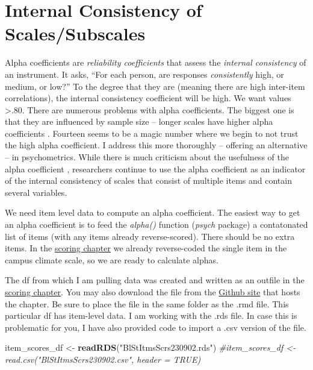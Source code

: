 \documentclass[
  11pt,
]{book}
\newenvironment{Shaded}{\begin{snugshade}}{\end{snugshade}}
\newcommand{\CommentTok}[1]{\textcolor[rgb]{0.37,0.37,0.37}{\textit{#1}}}
\newcommand{\FunctionTok}[1]{\textcolor[rgb]{0.27,0.27,0.27}{\textbf{#1}}}
\newcommand{\NormalTok}[1]{#1}
\newcommand{\OtherTok}[1]{\textcolor[rgb]{0.37,0.37,0.37}{#1}}
\newcommand{\StringTok}[1]{\textcolor[rgb]{0.5,0.5,0.5}{#1}}
\begin{document}
\hypertarget{internal-consistency-of-scalessubscales}{%
\section{Internal Consistency of Scales/Subscales}\label{internal-consistency-of-scalessubscales}}

Alpha coefficients are \emph{reliability coefficients} that assess the \emph{internal consistency} of an instrument. It asks, ``For each person, are responses \emph{consistently} high, or medium, or low?'' To the degree that they are (meaning there are high inter-item correlations), the internal consistency coefficient will be high. We want values \textgreater.80. There are numerous problems with alpha coefficients. The biggest one is that they are influenced by sample size -- longer scales have higher alpha coefficients \citep{cortina_what_1993}. Fourteen seems to be a magic number where we begin to not trust the high alpha coefficient. I address this more thoroughly -- offering an alternative -- in psychometrics. While there is much criticism about the usefulness of the alpha coefficient \citep{sijtsma_use_2009}, researchers continue to use the alpha coefficient as an indicator of the internal consistency of scales that consist of multiple items and contain several variables.

We need item level data to compute an alpha coefficient. The easiest way to get an alpha coefficient is to feed the \emph{alpha()} function (\emph{psych} package) a contatonated list of items (with any items already reverse-scored). There should be no extra items. In the \protect\hyperlink{score}{scoring chapter} we already reverse-coded the single item in the campus climate scale, so we are ready to calculate alphas.

The df from which I am pulling data was created and written as an outfile in the \protect\hyperlink{score}{scoring chapter}. You may also download the file from the \href{https://github.com/lhbikos/ReC_MultivModel}{Github site} that hosts the chapter. Be sure to place the file in the same folder as the .rmd file. This particular df has item-level data. I am working with the .rds file. In case this is problematic for you, I have also provided code to import a .csv version of the file.

\begin{Shaded}
\begin{Highlighting}[]
\NormalTok{item\_scores\_df }\OtherTok{\textless{}{-}} \FunctionTok{readRDS}\NormalTok{(}\StringTok{"BlStItmsScrs230902.rds"}\NormalTok{)}
\CommentTok{\#item\_scores\_df \textless{}{-} read.csv("BlStItmsScrs230902.csv", header = TRUE)}
\end{Highlighting}
\end{Shaded}
\end{document}
